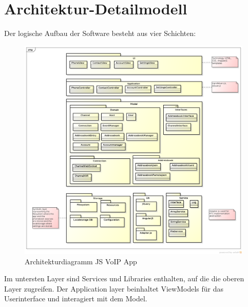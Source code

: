 \section{Architektur-Detailmodell}
	Der logische Aufbau der Software besteht aus vier Schichten:
	\begin{figure}[H]
		\centering
		\includegraphics[width=1\textwidth]{../architekturanalayse/img/architecture.png}
		\caption{Architekturdiagramm JS VoIP App}
	\end{figure}
	Im untersten Layer sind Services und Libraries enthalten, auf die die oberen Layer zugreifen.
	Der Application layer beinhaltet ViewModels für das Userinterface und interagiert mit dem Model.
	

